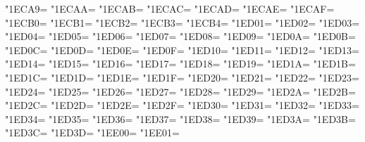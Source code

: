 \XeTeXcharclass"1ECA9=\KclassArabU
\XeTeXcharclass"1ECAA=\KclassArabU
\XeTeXcharclass"1ECAB=\KclassArabU
\XeTeXcharclass"1ECAC=\KclassArabU
\XeTeXcharclass"1ECAD=\KclassArabU
\XeTeXcharclass"1ECAE=\KclassArabU
\XeTeXcharclass"1ECAF=\KclassArabU
\XeTeXcharclass"1ECB0=\KclassArabU
\XeTeXcharclass"1ECB1=\KclassArabU
\XeTeXcharclass"1ECB2=\KclassArabU
\XeTeXcharclass"1ECB3=\KclassArabU
\XeTeXcharclass"1ECB4=\KclassArabU
\XeTeXcharclass"1ED01=\KclassArabU
\XeTeXcharclass"1ED02=\KclassArabU
\XeTeXcharclass"1ED03=\KclassArabU
\XeTeXcharclass"1ED04=\KclassArabU
\XeTeXcharclass"1ED05=\KclassArabU
\XeTeXcharclass"1ED06=\KclassArabU
\XeTeXcharclass"1ED07=\KclassArabU
\XeTeXcharclass"1ED08=\KclassArabU
\XeTeXcharclass"1ED09=\KclassArabU
\XeTeXcharclass"1ED0A=\KclassArabU
\XeTeXcharclass"1ED0B=\KclassArabU
\XeTeXcharclass"1ED0C=\KclassArabU
\XeTeXcharclass"1ED0D=\KclassArabU
\XeTeXcharclass"1ED0E=\KclassArabU
\XeTeXcharclass"1ED0F=\KclassArabU
\XeTeXcharclass"1ED10=\KclassArabU
\XeTeXcharclass"1ED11=\KclassArabU
\XeTeXcharclass"1ED12=\KclassArabU
\XeTeXcharclass"1ED13=\KclassArabU
\XeTeXcharclass"1ED14=\KclassArabU
\XeTeXcharclass"1ED15=\KclassArabU
\XeTeXcharclass"1ED16=\KclassArabU
\XeTeXcharclass"1ED17=\KclassArabU
\XeTeXcharclass"1ED18=\KclassArabU
\XeTeXcharclass"1ED19=\KclassArabU
\XeTeXcharclass"1ED1A=\KclassArabU
\XeTeXcharclass"1ED1B=\KclassArabU
\XeTeXcharclass"1ED1C=\KclassArabU
\XeTeXcharclass"1ED1D=\KclassArabU
\XeTeXcharclass"1ED1E=\KclassArabU
\XeTeXcharclass"1ED1F=\KclassArabU
\XeTeXcharclass"1ED20=\KclassArabU
\XeTeXcharclass"1ED21=\KclassArabU
\XeTeXcharclass"1ED22=\KclassArabU
\XeTeXcharclass"1ED23=\KclassArabU
\XeTeXcharclass"1ED24=\KclassArabU
\XeTeXcharclass"1ED25=\KclassArabU
\XeTeXcharclass"1ED26=\KclassArabU
\XeTeXcharclass"1ED27=\KclassArabU
\XeTeXcharclass"1ED28=\KclassArabU
\XeTeXcharclass"1ED29=\KclassArabU
\XeTeXcharclass"1ED2A=\KclassArabU
\XeTeXcharclass"1ED2B=\KclassArabU
\XeTeXcharclass"1ED2C=\KclassArabU
\XeTeXcharclass"1ED2D=\KclassArabU
\XeTeXcharclass"1ED2E=\KclassArabU
\XeTeXcharclass"1ED2F=\KclassArabU
\XeTeXcharclass"1ED30=\KclassArabU
\XeTeXcharclass"1ED31=\KclassArabU
\XeTeXcharclass"1ED32=\KclassArabU
\XeTeXcharclass"1ED33=\KclassArabU
\XeTeXcharclass"1ED34=\KclassArabU
\XeTeXcharclass"1ED35=\KclassArabU
\XeTeXcharclass"1ED36=\KclassArabU
\XeTeXcharclass"1ED37=\KclassArabU
\XeTeXcharclass"1ED38=\KclassArabU
\XeTeXcharclass"1ED39=\KclassArabU
\XeTeXcharclass"1ED3A=\KclassArabU
\XeTeXcharclass"1ED3B=\KclassArabU
\XeTeXcharclass"1ED3C=\KclassArabU
\XeTeXcharclass"1ED3D=\KclassArabU
\XeTeXcharclass"1EE00=\KclassArabU
\XeTeXcharclass"1EE01=\KclassArabU
